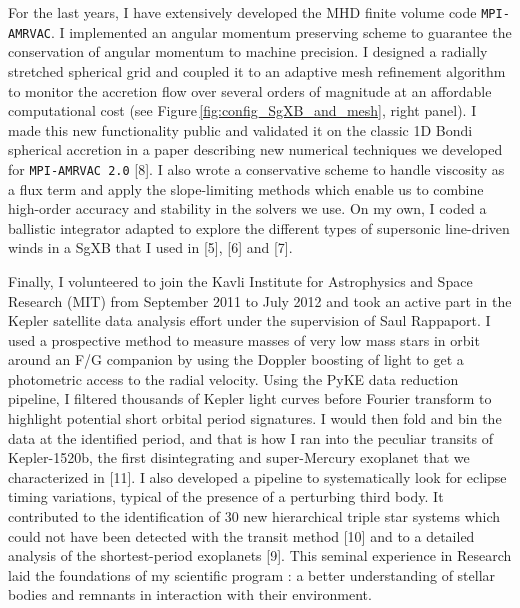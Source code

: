 \documentclass[12pt,onecolumn]{article}
\newcommand{\sgx}{SgXB\xspace}
\begin{document}
For the last years, I have extensively developed the MHD finite volume code \texttt{MPI-AMRVAC}. I implemented an angular momentum preserving scheme to guarantee the conservation of angular momentum to machine precision. I designed a radially stretched spherical grid and coupled it to an adaptive mesh refinement algorithm to monitor the accretion flow over several orders of magnitude at an affordable computational cost (see Figure\,\ref{fig:config_SgXB_and_mesh}, right panel). I made this new functionality public and validated it on the classic 1D Bondi spherical accretion in a paper describing new numerical techniques we developed for \texttt{MPI-AMRVAC 2.0} [8]. I also wrote a conservative scheme to handle viscosity as a flux term and apply the slope-limiting methods which enable us to combine high-order accuracy and stability in the solvers we use. On my own, I coded a ballistic integrator adapted to explore the different types of supersonic line-driven winds in a \sgx that I used in [5], [6] and [7].


Finally, I volunteered to join the Kavli Institute for Astrophysics and Space Research (MIT) from September 2011 to July 2012 and took an active part in the Kepler satellite data analysis effort under the supervision of Saul Rappaport. I used a prospective method to measure masses of very low mass stars in orbit around an F/G companion by using the Doppler boosting of light to get a photometric access to the radial velocity. Using the PyKE data reduction pipeline, I filtered thousands of Kepler light curves before Fourier transform to highlight potential short orbital period signatures. I would then fold and bin the data at the identified period, and that is how I ran into the peculiar transits of Kepler-1520b, the first disintegrating and super-Mercury exoplanet that we characterized in [11]. I also developed a pipeline to systematically look for eclipse timing variations, typical of the presence of a perturbing third body. It contributed to the identification of 30 new hierarchical triple star systems which could not have been detected with the transit method [10] and to a detailed analysis of the shortest-period exoplanets [9]. This seminal experience in Research laid the foundations of my scientific program : a better understanding of stellar bodies and remnants in interaction with their environment.
\end{document}
